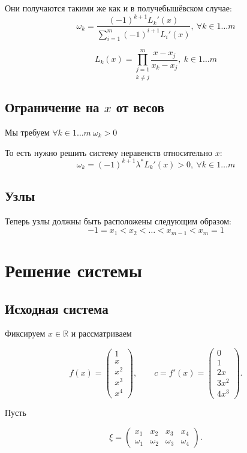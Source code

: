 \documentclass[12pt,a4paper]{article}
\begin{document}
	\noindent Они получаются такими же как и в получебышёвском случае:
	\[
	\omega_k  = 
	\frac
	{
		(-1)^{k+1} L_k'(x)
	}
	{
		\sum_{i=1}^{m} (-1)^{i+1}  L_i'(x)
	}, \ \forall k \in 1 \ldots m 
	\]
	
	\[
	L_k(x) = \underset{k \neq j}{\prod_{j=1}^{m}} \frac{x - x_j}{x_k - x_j}, \ k \in 1 \ldots m
	\]
	
	\subsection{Ограничение на $x$ от весов}
	
	Мы требуем $\forall k \in 1 \ldots m \ \omega_k > 0 $
	
	\noindent То есть нужно решить систему неравенств относительно $x$:
	\[
	\omega_k  = 
	(-1)^{k+1} \lambda^* L_k'(x)> 0 , \ \forall k \in 1 \ldots m 
	\]
	
	\subsection{Узлы}
	
	Теперь узлы должны быть расположены следующим образом:
	\[
	-1 = x_1 < x_2 < \ldots < x_{m-1} < x_m = 1
	\]
	
	
	\section{Решение системы}
	
	\subsection{Исходная система}
	
	Фиксируем $x\in\mathbb{R}$ и рассматриваем
	
	$$
	f(x)=
	\begin{pmatrix}
		1\\
		x\\
		x^2\\
		x^3\\
		x^4
	\end{pmatrix},
	\qquad
	c=f'(x)=
	\begin{pmatrix}
		0\\
		1\\
		2x\\
		3x^2\\
		4x^3
	\end{pmatrix}.
	$$
	
	Пусть
	
	$$
	\xi=
	\begin{pmatrix}
		x_1&x_2&x_3&x_4\\
		\omega_1&\omega_2&\omega_3&\omega_4
	\end{pmatrix}.
	$$
	
\end{document}
